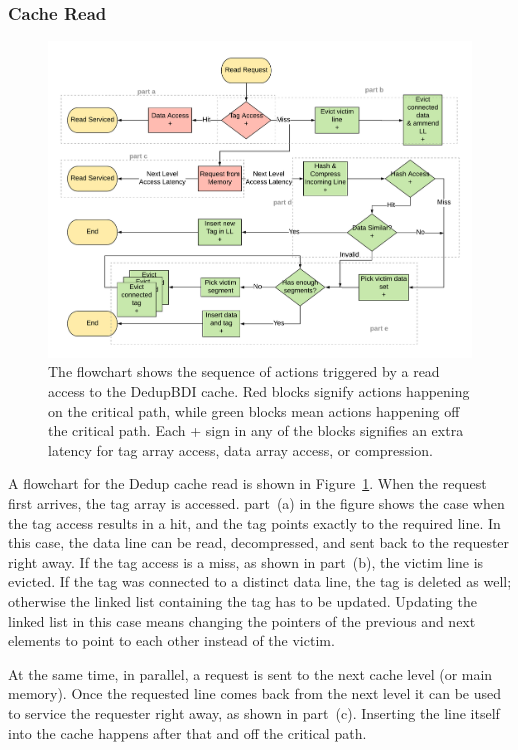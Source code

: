 \subsubsection{Cache Read}
\begin{figure}
    \includegraphics[width=\textwidth]{DedupBDI_Read.pdf}
    \caption[DedupBDI Read]{The flowchart shows the sequence of actions triggered by a read access to the DedupBDI cache. Red blocks signify actions happening on the critical path, while green blocks mean actions happening off the critical path. Each + sign in any of the blocks signifies an extra latency for tag array access, data array access, or compression.}
    \label{fig:DedupBDI_Read}
\end{figure}
A flowchart for the Dedup cache read is shown in Figure~\ref{fig:DedupBDI_Read}. When the request first arrives, the tag array is accessed. part~(a) in the figure shows the case when the tag access results in a hit, and the tag points exactly to the required line. In this case, the data line can be read, decompressed, and sent back to the requester right away. If the tag access is a miss, as shown in part~(b), the victim line is evicted. If the tag was connected to a distinct data line, the tag is deleted as well; otherwise the linked list containing the tag has to be updated. Updating the linked list in this case means changing the pointers of the previous and next elements to point to each other instead of the victim.\par
At the same time, in parallel, a request is sent to the next cache level (or main memory). Once the requested line comes back from the next level it can be used to service the requester right away, as shown in part~(c). Inserting the line itself into the cache happens after that and off the critical path.\par
